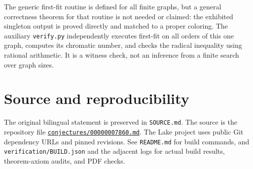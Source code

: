\documentclass[11pt]{article}
\begin{document}
The generic first-fit routine is defined for all finite graphs, but a general correctness theorem for that routine is not needed or claimed: the exhibited singleton output is proved directly and matched to a proper coloring. The auxiliary \texttt{verify.py} independently executes first-fit on all orders of this one graph, computes its chromatic number, and checks the radical inequality using rational arithmetic. It is a witness check, not an inference from a finite search over graph sizes.

\section*{Source and reproducibility}
The original bilingual statement is preserved in \texttt{SOURCE.md}. The source is the repository file
\href{https://github.com/The-Last-Math-Competition/The-Last-Math-Competition/blob/main/conjectures/00000007860.md}{\texttt{conjectures/00000007860.md}}.
The Lake project uses public Git dependency URLs and pinned revisions. See \texttt{README.md} for build commands, and \texttt{verification/BUILD.json} and the adjacent logs for actual build results, theorem-axiom audits, and PDF checks.
\end{document}
